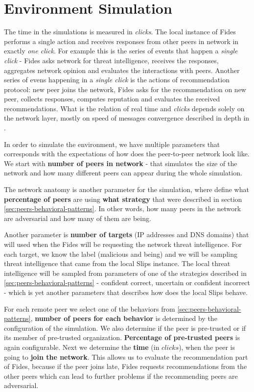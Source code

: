 \section{Environment Simulation}
\label{sec:environment-simulation}
The time in the simulations is measured in \textit{clicks}. 
The local instance of Fides performs a single action and receives responses from other peers in network in exactly \textit{one click}. 
For example this is the series of events that happen a \textit{single click} - Fides asks network for threat intelligence, receives the responses, aggregates network opinion and evaluates the interactions with peers.
Another series of evens happening in a \textit{single click} is the actions of  recommendation protocol: new peer joins the network, Fides asks for the recommendation on new peer, collects responses, computes reputation and evaluates the received recommendations.
What is the relation of real time and \textit{clicks} depends solely on the network layer, mostly on speed of messages convergence described in depth in \cite{nl}.

In order to simulate the environment, we have multiple parameters that corresponds with the expectations of how does the peer-to-peer network look like.
We start with \textbf{number of peers in network} - that simulates the size of the network and how many different peers can appear during the whole simulation.

The network anatomy is another parameter for the simulation, where define what \textbf{percentage of peers} are using \textbf{what strategy} that were described in section \ref{sec:peers-behavioral-patterns}. 
In other words, how many peers in the network are adversarial and how many of them are being.

Another parameter is \textbf{number of targets} (IP addresses and DNS domains) that will used when the Fides will be requesting the network threat intelligence.
For each target, we know the label (malicious and being) and we will be sampling threat intelligence that came from the local Slips instance. 
The local threat intelligence will be sampled from parameters of one of the strategies described in \ref{sec:peers-behavioral-patterns} - confident correct, uncertain or confident incorrect - which is yet another parameters that describes how does the local Slips behave.

For each remote peer we select one of the behaviors from \ref{sec:peers-behavioral-patterns}, \textbf{number of peers for each behavior} is determined by the configuration of the simulation.
We also determine if the peer is pre-trusted or if its member of pre-trusted organization. \textbf{Percentage of pre-trusted peers} is again configurable.
Next we determine the \textbf{time} (in $clicks$), when the peer is going to \textbf{join the network}. This allows us to evaluate the recommendation part of Fides, because if the peer joins late, Fides requests recommendations from the other peers which can lead to further problems if the recommending peers are adversarial.

